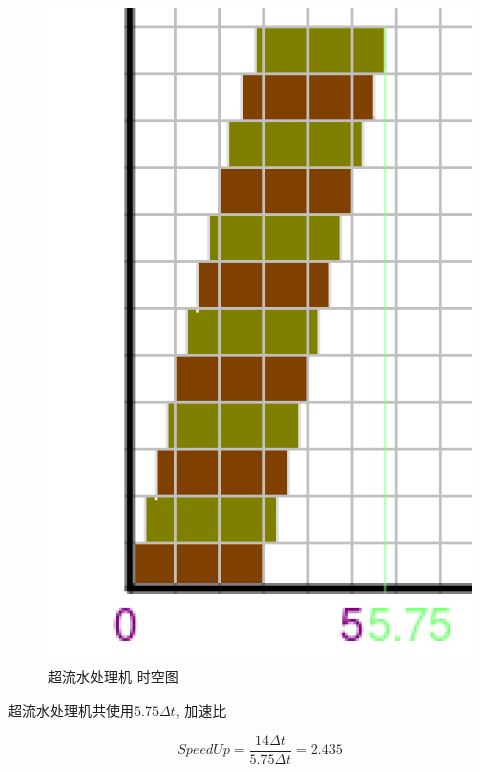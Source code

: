 \documentclass{article}
\begin{document}
\begin{CJK}{UTF8}{gbsn}
\begin{figure}[H]
\centering
\includegraphics[scale=0.3]{hw3-img4.png}
\caption{超流水处理机 时空图}
\end{figure}

超流水处理机共使用$5.75\Delta t$, 加速比

$$SpeedUp = \frac{14\Delta t}{5.75\Delta t} = 2.435$$




\end{CJK}
\end{document}
